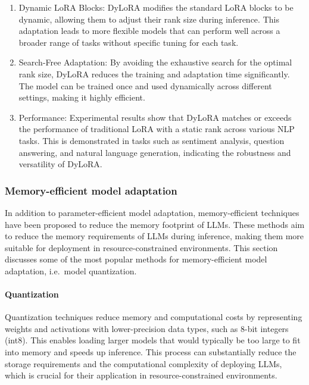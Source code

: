 \begin{enumerate}
	\item Dynamic LoRA Blocks: DyLoRA modifies the standard LoRA blocks to be dynamic, allowing them to adjust their rank size during inference. This adaptation leads to more flexible models that can perform well across a broader range of tasks without specific tuning for each task.

	\item Search-Free Adaptation: By avoiding the exhaustive search for the optimal rank size, DyLoRA reduces the training and adaptation time significantly. The model can be trained once and used dynamically across different settings, making it highly efficient.

	\item Performance: Experimental results show that DyLoRA matches or exceeds the performance of traditional LoRA with a static rank across various NLP tasks. This is demonstrated in tasks such as sentiment analysis, question answering, and natural language generation, indicating the robustness and versatility of DyLoRA.

\end{enumerate}

\subsubsection{Memory-efficient model adaptation}
\label{subsubsec:memory-efficient}

In addition to parameter-efficient model adaptation, memory-efficient techniques have been proposed to reduce the memory footprint of LLMs.
These methods aim to reduce the memory requirements of LLMs during inference, making them more suitable for deployment in resource-constrained environments.
This section discusses some of the most popular methods for memory-efficient model adaptation, i.e.\ model quantization.

\paragraph{Quantization}
\label{subsubsec:quantization}

Quantization techniques reduce memory and computational costs by representing weights and activations with lower-precision data types, such as 8-bit integers (int8).
This enables loading larger models that would typically be too large to fit into memory and speeds up inference.
This process can substantially reduce the storage requirements and the computational complexity of deploying LLMs, which is crucial for their application in resource-constrained environments.

